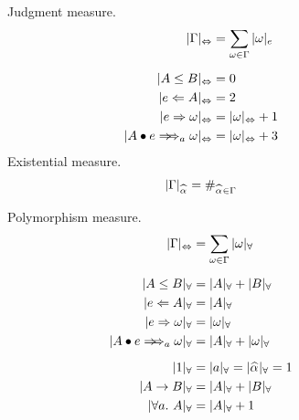 \begin{figure}[h!]
\begin{minipage}[t]{.5\textwidth}
        \centering\framebox{$|\Gm|_\Leftrightarrow$, $|\jg|_\Leftrightarrow$} {Judgment measure.}
        \begin{gather*}
            \begin{aligned}
            |\Gm|_\Leftrightarrow &= \sum_{\jg \in \Gm} |\jg|_e\\[2mm]
            |A \le B|_\Leftrightarrow &= 0\\
            |e \Lto A|_\Leftrightarrow &= 2\\
            |e \To \jg|_\Leftrightarrow &= |\jg|_\Leftrightarrow + 1\\
            |\appInfAlg{A}{e}|_\Leftrightarrow &= |\jg|_\Leftrightarrow + 3
            \end{aligned}
        \end{gather*}
        \centering\framebox{$|\Gm|_{\al}$} {Existential measure.}
        \begin{gather*}
            \begin{aligned}
            |\Gm|_{\al} &= \#_{\al\in\Gm}\\
            \end{aligned}
        \end{gather*}
    \end{minipage}%
    \begin{minipage}[t]{.5\textwidth}
        \centering{} {Polymorphism measure.}
        \begin{gather*}
            \begin{aligned}
            |\Gm|_\Leftrightarrow &= \sum_{\jg \in \Gm} |\jg|_\forall\\[2mm]
            |A \le B|_\forall &= |A|_\forall + |B|_\forall\\
            |e \Lto A|_\forall &= |A|_\forall\\
            |e \To \jg|_\forall &= |\jg|_\forall\\
            |\appInfAlg{A}{e}|_\forall &= |A|_\forall + |\jg|_\forall\\[2mm]
            |1|_\forall &= |a|_\forall = |\al|_\forall = 1\\
            |A\to B|_\forall &= |A|_\forall + |B|_\forall\\
            |\all A|_\forall &= |A|_\forall + 1
            \end{aligned}
        \end{gather*}
        

\end{minipage}
\end{figure}
